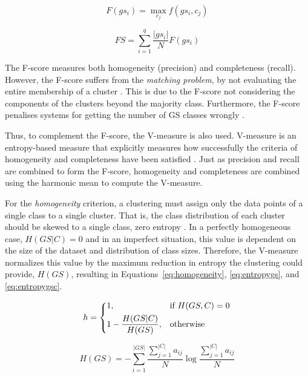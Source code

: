 \begin{equation} \label{eq:fscoregs}
 F(gs_i) = \underset{c_j}{\max} f(gs_i, c_j)
\end{equation}

\begin{equation} \label{eq:fscore}
 FS = \sum_{i=1}^q \frac{|gs_i|}{N}F(gs_i)
\end{equation}

The F-score measures both homogeneity (precision) and completeness (recall).
However, the F-score suffers from the \textit{matching problem}, by not
evaluating the entire membership of a cluster \citep{rosenberg2007v}. This is
due to the F-score not considering the components of the clusters beyond the
majority class. Furthermore, the F-score penalises systems for getting the
number of \ac{GS} classes wrongly \citep{manandhar2009semeval}.

Thus, to complement the F-score, the V-measure is also used. V-measure is an
entropy-based measure that explicitly measures how successfully the criteria
of homogeneity and completeness have been satisfied \citep{rosenberg2007v}. Just
as precision and recall are combined to form the F-score, homogeneity and
completeness are combined using the harmonic mean to compute the V-measure.

For the \emph{homogeneity} criterion, a clustering must assign only the data 
points of a single class to a single cluster. That is, the class distribution 
of each cluster should be skewed to a single class, zero entropy 
\citep{rosenberg2007v}. In a perfectly homogeneous case, $H(GS|C) = 0$ and in 
an imperfect situation, this value is dependent on the size of the dataset and 
distribution of class sizes. Therefore, the V-measure normalizes this value by 
the maximum reduction in entropy the clustering could provide, $H(GS)$, 
resulting in Equations~\ref{eq:homogeneity}, \ref{eq:entropygs}, and 
\ref{eq:entropygsc}.

\begin{equation} \label{eq:homogeneity}
 h = \begin{dcases}
      1,                        & \text{if } H(GS,C) = 0 \\
      1 - \frac{H(GS|C)}{H(GS)},& \text{otherwise} \\
     \end{dcases}
\end{equation}

\begin{equation} \label{eq:entropygs}
 H(GS) = - \sum_{i=1}^{|GS|} \frac{\sum_{j=1}^{|C|} a_{ij}}{N}
         \log \frac{\sum_{j=1}^{|C|} a_{ij}}{N}
\end{equation}

